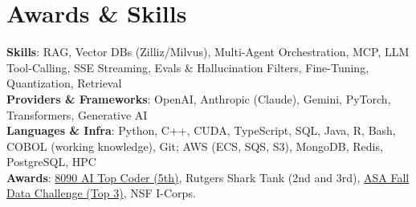 \documentclass[letterpaper,11pt]{article}
\begin{document}
\section{Awards \& Skills}
 \begin{itemize}[leftmargin=0.15in, label={}]
    \small{\item{
     \textbf{Skills}{: RAG, Vector DBs (Zilliz/Milvus), Multi-Agent Orchestration, MCP, LLM Tool-Calling, SSE Streaming, Evals \& Hallucination Filters, Fine-Tuning, Quantization, Retrieval} \\
     \textbf{Providers \& Frameworks}{: OpenAI, Anthropic (Claude), Gemini, PyTorch, Transformers, Generative AI} \\
     \textbf{Languages \& Infra}{: Python, C++, CUDA, TypeScript, SQL, Java, R, Bash, COBOL (working knowledge), Git; AWS (ECS, SQS, S3), MongoDB, Redis, PostgreSQL, HPC} \\
     \textbf{Awards}{: \href{https://github.com/AkeBoss-tech/top-coder-challenge}{8090 AI Top Coder (5th)}, Rutgers Shark Tank (2nd and 3rd), \href{https://acashmoney.biz/portfolio/asa-fall-data/}{ASA Fall Data Challenge (Top 3)}, NSF I-Corps.}
    }}
 \end{itemize}
\end{document}
